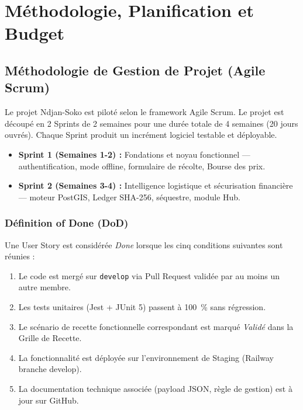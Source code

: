 \documentclass[12pt,a4paper]{report}
\begin{document}
\chapter{Méthodologie, Planification et Budget}

\section{Méthodologie de Gestion de Projet (Agile Scrum)}

Le projet Ndjan-Soko est piloté selon le framework Agile Scrum. Le projet est découpé en 2 Sprints de 2 semaines pour une durée totale de 4 semaines (20 jours ouvrés). Chaque Sprint produit un incrément logiciel testable et déployable.

\begin{itemize}
  \item \textbf{Sprint 1 (Semaines 1-2) :} Fondations et noyau fonctionnel — authentification, mode offline, formulaire de récolte, Bourse des prix.
  \item \textbf{Sprint 2 (Semaines 3-4) :} Intelligence logistique et sécurisation financière — moteur PostGIS, Ledger SHA-256, séquestre, module Hub.
\end{itemize}

\subsection{Définition of Done (DoD)}

Une User Story est considérée \textit{Done} lorsque les cinq conditions suivantes sont réunies :

\begin{enumerate}
  \item Le code est mergé sur \texttt{develop} via Pull Request validée par au moins un autre membre.
  \item Les tests unitaires (Jest + JUnit 5) passent à 100~\% sans régression.
  \item Le scénario de recette fonctionnelle correspondant est marqué \textit{Validé} dans la Grille de Recette.
  \item La fonctionnalité est déployée sur l'environnement de Staging (Railway branche develop).
  \item La documentation technique associée (payload JSON, règle de gestion) est à jour sur GitHub.
\end{enumerate}
\end{document}
